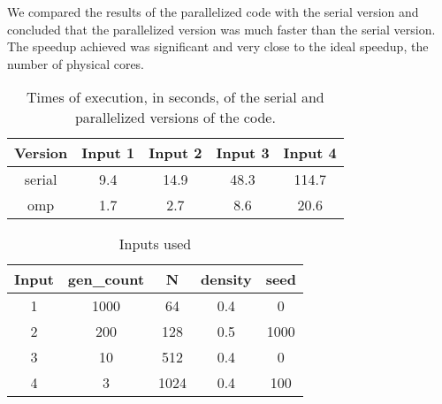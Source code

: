 \documentclass{article}
\begin{document}
We compared the results of the parallelized code with the serial version and 
concluded that the parallelized version was much faster than the serial version. 
The speedup achieved was significant and very close to the ideal speedup, the number of 
physical cores.

\begin{table}[h!]
	\centering
	\begin{tabular}{||c c c c c||} 
	 \hline
	 Version & Input 1 & Input 2 & Input 3 & Input 4  \\ [0.5ex] 
	 \hline\hline
	 serial & 9.4 & 14.9 & 48.3 & 114.7 \\ 
	 omp & 1.7 & 2.7 & 8.6 & 20.6 \\ [1ex] 
	 \hline
	\end{tabular}
	\caption{Times of execution, in seconds, of the serial and parallelized versions of the code.}
	\label{table:1}
\end{table}

\begin{table}[h!]
	\centering
	\begin{tabular}{||c c c c c||} 
	 \hline
	 Input & gen\_count & N & density & seed  \\ [0.5ex] 
	 \hline\hline
	 1 & 1000 & 64 & 0.4 & 0 \\ 
	 2 & 200 & 128 & 0.5 & 1000 \\
	 3 & 10 & 512 & 0.4 & 0 \\ 
	 4 & 3 & 1024 & 0.4 & 100 \\ [1ex] 
	 \hline
	\end{tabular}
	\caption{Inputs used}
	\label{table:2}
\end{table}

\newpage



% 

\end{document}

